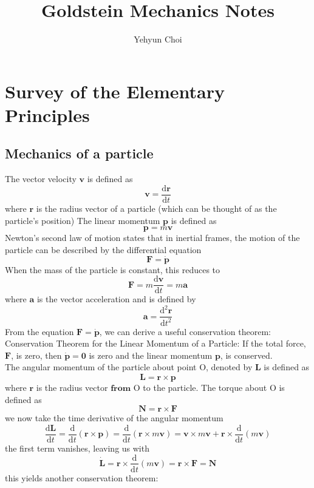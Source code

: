 \documentclass[]{article}
\title{Goldstein Mechanics Notes}
\author{Yehyun Choi}
\numberwithin{equation}{section}
\begin{document}
\maketitle

\section{Survey of the Elementary Principles}
\subsection{Mechanics of a particle}
The vector velocity $\mathbf{v}$ is defined as 
\begin{equation}\mathbf{v}=\frac{\mathrm{d}\mathbf{r}}{\mathrm{d}t}\end{equation}
where $\mathbf{r}$ is the radius vector of a particle (which can be thought of as the particle's position)
The linear momentum $\mathbf{p}$ is defined as
\begin{equation}\mathbf{p}=m\mathbf{v}\end{equation}
Newton's second law of motion states that in inertial frames, the motion of the particle can be described by the differential equation
\begin{equation}\boxed{\mathbf{F}=\dot{\mathbf{p}}}\end{equation}
When the mass of the particle is constant, this reduces to 
$$\mathbf{F}=m\frac{\mathrm{d}\mathbf{v}}{\mathrm{d}t}=m\mathbf{a}$$
where $\mathbf{a}$ is the vector acceleration and is defined by 
\begin{equation}\mathbf{a}=\frac{\mathrm{d}^2\mathbf{r}}{\mathrm{d}t^2}\end{equation}
From the equation $\mathbf{F}=\dot{\mathbf{p}}$, we can derive a useful conservation theorem:\\

Conservation Theorem for the Linear Momentum of a Particle: If the total force, $\mathbf{F}$, is zero, then $\dot{\mathbf{p}}=\mathbf{0}$ is zero and the linear momentum $\mathbf{p}$, is conserved.\\

The angular momentum of the particle about point O, denoted by $\mathbf L$ is defined as 
\begin{equation}\mathbf L=\mathbf r\times\mathbf p\end{equation}
where $\mathbf r$ is the radius vector $\textbf{from}$ O to the particle. 
The torque about O is defined as 
\begin{equation}\mathbf N=\mathbf r\times\mathbf F\end{equation}
we now take the time derivative of the angular momentum
$$\frac{\mathrm d\mathbf L}{\mathrm dt}=\frac{\mathrm d}{\mathrm dt}(\mathbf r\times\mathbf p)=\frac{\mathrm d}{\mathrm dt}(\mathbf r\times m\mathbf v)=\mathbf v\times m\mathbf v+\mathbf r\times\frac{\mathrm d}{\mathrm dt}(m\mathbf v)$$
the first term vanishes, leaving us with
\begin{equation}\boxed{\dot{\mathbf L}=\mathbf r\times\frac{\mathrm d}{\mathrm dt}(m\mathbf v)=\mathbf r\times\mathbf F=\mathbf N}\end{equation}
this yields another conservation theorem:\\
\end{document}
